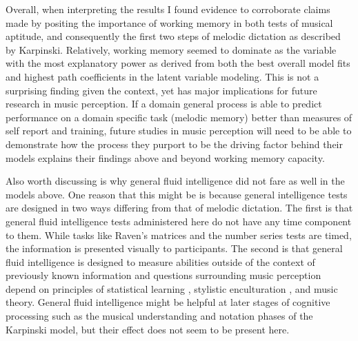 \documentclass[12pt,]{book}
\begin{document}
Overall, when interpreting the results I found evidence to corroborate claims made by \citet{berzWorkingMemoryMusic1995} positing the importance of working memory in both tests of musical aptitude, and consequently the first two steps of melodic dictation as described by Karpinski.
Relatively, working memory seemed to dominate as the variable with the most explanatory power as derived from both the best overall model fits and highest path coefficients in the latent variable modeling.
This is not a surprising finding given the context, yet has major implications for future research in music perception.
If a domain general process is able to predict performance on a domain specific task (melodic memory) better than measures of self report and training, future studies in music perception will need to be able to demonstrate how the process they purport to be the driving factor behind their models explains their findings above and beyond working memory capacity.

Also worth discussing is why general fluid intelligence did not fare as well in the models above.
One reason that this might be is because general intelligence tests are designed in two ways differing from that of melodic dictation.
The first is that general fluid intelligence tests administered here do not have any time component to them.
While tasks like Raven's matrices \citep{ravenManualRavenProgressive1994} and the number series \citep{thurstonePrimaryMentalAbilities1938} tests are timed, the information is presented visually to participants.
The second is that general fluid intelligence is designed to measure abilities outside of the context of previously known information \citep{cattellAbilitiesTheirGrowth1971} and questions surrounding music perception depend on principles of statistical learning \citep{huronSweetAnticipation2006, pearceStatisticalLearningProbabilistic2018a, saffranStatisticalLearningTone1999}, stylistic enculturation \citep{demorestLostTranslationEnculturation2008, eerolaExpectancySamiYoiks2009, meyerEmotionMeaningMusic1956}, and music theory.
General fluid intelligence might be helpful at later stages of cognitive processing such as the musical understanding and notation phases of the Karpinski model, but their effect does not seem to be present here.
\end{document}

